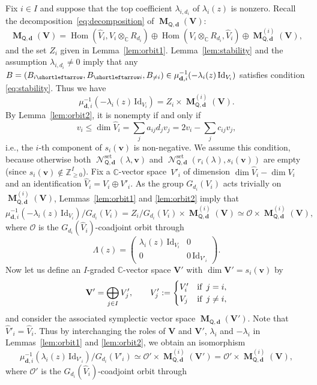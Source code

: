 \documentclass[pdftex]{sigma}
\newcommand{\slar}{\shortleftarrow}
\numberwithin{equation}{section}
\theoremstyle{definition}
\newcommand{\lemref}[1]{Lemma~\ref{#1}}
\newcommand{\Z}{\mathbb{Z}} %
\newcommand{\C}{\mathbb{C}} %
\newcommand{\Hom}{\operatorname{Hom}}
\newcommand{\unit}{\mathrm{Id}}
\newcommand{\bM}{\operatorname{\mathbf{M}}}
\newcommand{\bV}{\mathbf{V}}
\newcommand{\bv}{\mathbf{v}}
\newcommand{\ved}{\mathbf{d}}
\newcommand{\bO}{\mathcal{O}}
\newcommand{\hquad}{\hspace{.5em}}
\newcommand{\Qset}{\operatorname{\mathscr{N}}^\mathrm{set}}
\newcommand{\QQ}{\mathsf{Q}} %
\begin{document}
Fix $i \in I$ and
suppose that the top coef\/f\/icient
$\lambda_{i,d_i}$ of $\lambda_i(z)$ is nonzero.
Recall the decomposition~\eqref{eq:decomposition} of $\bM_{\QQ,\ved}(\bV)$:
\[
\bM_{\QQ,\ved}(\bV) =\Hom(\widehat{V}_i,V_i \otimes_\C R_{d_i})
\oplus \Hom(V_i \otimes_\C R_{d_i}, \widehat{V}_i)
\oplus \bM^{(i)}_{\QQ,\ved}(\bV),
\]
and the set $Z_i$ given in \lemref{lem:orbit1}.
\lemref{lem:stability} and the assumption $\lambda_{i,d_i} \neq 0$
imply that any
$B=(B_{i \slar},B_{\slar i},B_{\neq i})
\in \mu_{\ved,i}^{-1}(-\lambda_i(z)\,\unit_{V_i})$
satisf\/ies condition \eqref{eq:stability}.
Thus we have
\[
\mu_{\ved,i}^{-1}(-\lambda_i(z)\,\unit_{V_i})
=Z_i \times \bM^{(i)}_{\QQ,\ved}(\bV).
\]
By \lemref{lem:orbit2},
it is nonempty if and only if
\[
v_i \leq \dim \widehat{V}_i
= \sum_j a_{ij} d_j v_j = 2v_i -\sum_j c_{ij}v_j,
\]
i.e., the $i$-th component of $s_i(\bv)$ is non-negative.
We assume this condition,
because otherwise both
$\Qset_{\QQ,\ved}(\lambda,\bv)$ and
$\Qset_{\QQ,\ved}(r_i(\lambda),s_i(\bv))$ are empty
(since $s_i(\bv) \notin \Z_{\geq 0}^I$).
Fix a $\C$-vector space~$V'_i$ of dimension
$\dim \widehat{V}_i - \dim V_i$ and an identif\/ication
$\widehat{V}_i = V_i \oplus V'_i$.
As the group $G_{d_i}(V_i)$ acts trivially on $\bM^{(i)}_{\QQ,\ved}(\bV)$,
Lemmas~\ref{lem:orbit1} and \ref{lem:orbit2} imply that
\[
\mu_{\ved,i}^{-1}(-\lambda_i(z)\,\unit_{V_i})/G_{d_i}(V_i) =
Z_i/G_{d_i}(V_i) \times \bM^{(i)}_{\QQ,\ved}(\bV)
\simeq \bO \times \bM^{(i)}_{\QQ,\ved}(\bV),
\]
where $\bO$ is the $G_{d_i}(\widehat{V}_i)$-coadjoint orbit
through
\[
\Lambda(z)= \begin{pmatrix}
\lambda_i(z)\,\unit_{V_i} & 0 \\
0 & 0\,\unit_{V'_i} \end{pmatrix}.
\]
Now let us def\/ine an $I$-graded $\C$-vector space $\bV'$
with $\dim \bV'=s_i(\bv)$ by
\[
\bV'=\bigoplus_{j \in I} V'_j, \qquad
V'_j := \begin{cases}
V'_i & \text{if}\hquad j=i, \\
V_j & \text{if}\hquad j\neq i,
\end{cases}
\]
and consider the associated symplectic vector space $\bM_{\QQ,\ved}(\bV')$.
Note that $\widehat{V}'_i =\widehat{V}_i$.
Thus by interchanging the roles of $\bV$ and $\bV'$,
$\lambda_i$ and $-\lambda_i$ in Lemmas~\ref{lem:orbit1} and \ref{lem:orbit2},
we obtain an isomorphism
\[
\mu_{\ved,i}^{-1}(\lambda_i(z)\,\unit_{V'_i})/G_{d_i}(V'_i) \simeq
\bO' \times \bM^{(i)}_{\QQ,\ved}(\bV')=\bO' \times \bM^{(i)}_{\QQ,\ved}(\bV),
\]
where $\bO'$ is the $G_{d_i}(\widehat{V}_i)$-coadjoint orbit through
\end{document}
